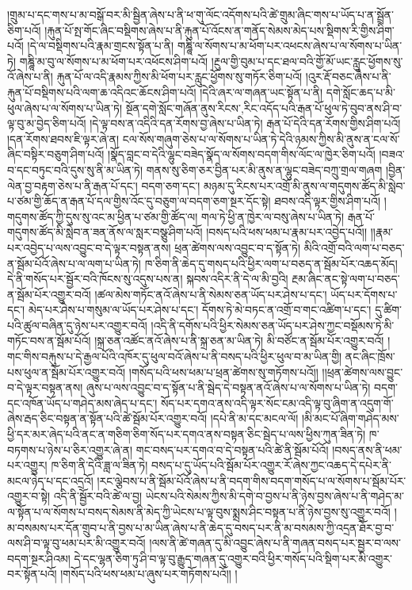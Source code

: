 །གྲུམ་པ་དང་གས་པ་མ་བསྒོ་བར་མི་སྦྱིན་ཞེས་པ་ནི་ཕ་གུ་ལོང་འདོགས་པའི་ཚེ་གྲུམ་ཞིང་གས་པ་ཡོད་པ་ན་སྦྲོན་ཅིག་པའོ། །རྐུན་པོ་སྤ་གོང་ཞིང་བསྡིགས་ཞེས་པ་ནི་རྐུན་པོ་འོངས་ན་གནོད་སེམས་མེད་པས་སྡིགས་རི་གྱིས་ཤིག་པའོ། །དེ་ལ་བསྡིགས་པའི་རྣམ་གྲངས་སྟོན་པ་ནི། གཎྜཱི་ལ་སོགས་པ་མ་ཕོག་པར་འཕངས་ཞེས་པ་ལ་སོགས་པ་ཡིན་ཏེ། གཎྜཱི་མ་བུ་ལ་སོགས་པ་མ་ཕོག་པར་འཕོངས་ཤིག་པའོ། །རྔུལ་གྱི་བུམ་པ་དང་ཐལ་བའི་གྱོ་མོ་ཡང་རླུང་ཕྱོགས་སུ་འོ་ཞེས་པ་ནི། རྐུན་པོ་ལ་འདི་རྣམས་ཀྱིས་མི་ཕོག་པར་རླུང་ཕྱོགས་སུ་གཏོར་ཅིག་པའོ། །འུར་རྡོ་བཅང་ཞེས་པ་ནི་རྐུན་པོ་བསྡིགས་པའི་ལག་ཆ་འདིའང་ཆོངས་ཤིག་པའོ། །དེའི་ཞར་ལ་གཞན་ཡང་སྟོན་པ་ནི། དགེ་སློང་ཆད་པ་མི་ཕུལ་ཞེས་པ་ལ་སོགས་པ་ཡིན་ཏེ། སྔོན་དགེ་སློང་གཞོན་ནུས་{རིངས་,རིང་}འདོད་པའི་རྒན་པོ་ཕུལ་ཏེ་བུབ་ནས་ཤི་བ་ལྟ་བུ་མ་བྱེད་ཅིག་པའོ། །དེ་ལྟ་བས་ན་འདིའི་དན་རོགས་བྱ་ཞེས་པ་ཡིན་ཏེ། རྒན་པོ་དེའི་དན་རོགས་གྱིས་ཤིག་པའོ། །དན་རོགས་ཐབས་ཇི་ལྟར་ཞེ་ན། ངལ་སོས་གཞུག་ཅེས་པ་ལ་སོགས་པ་ཡིན་ཏེ་དེའི་ཉམས་ཀྱིས་མི་ནུས་ན་ངལ་སོ་ཞིང་བསྟིར་བཅུག་ཤིག་པའོ། །སྣོད་བླང་བ་དེའི་ལྷུང་བཟེད་སྣོད་ལ་སོགས་བདག་གིས་ལོང་ལ་ཁྱེར་ཅིག་པའོ། །བཟའ་བ་དང་བཏུང་བའི་དུས་སུ་ནི་མ་ཡིན་ཏེ། གནས་སུ་ཅིག་ཅར་བྱིན་པར་མི་ནུས་ན་ལྷུང་བཟེད་བཀྲུ་གྲལ་གཞག །བྱིན་ལེན་བྱ་བརྟག་ཅེས་པ་ནི་རྒན་པོ་དང་། བདག་ཅག་དང་། མཉམ་དུ་རིངས་པར་འགྲོ་མི་ནུས་ལ་གདུགས་ཚོད་མི་སླེབ་པ་ཙམ་གྱི་ཆོད་ན་རྒན་པོ་དལ་གྱིས་འོང་དུ་བཅུག་ལ་བདག་ཅག་སྔར་དོང་སྟེ། ཐབས་འདི་ལྟར་གྱིས་ཤིག་པའོ། །གདུགས་ཚོད་ཀྱི་དུས་སུ་འང་མ་ཕྱིན་པ་ཙམ་གྱི་ཚོད་ལ། གལ་ཏེ་ཕྱི་ན་ཁྱེར་ལ་བསུ་ཞེས་པ་ཡིན་ཏེ། རྒན་པོ་གདུགས་ཚོད་མི་སླེབ་ན་ཟན་ནོས་ལ་སླར་བསྩུ་ཤིག་པའོ། །བསད་པའི་ཕས་ཕམ་པ་རྣམ་པར་འབྱེད་པའོ།། །།རྣམ་པར་འབྱེད་པ་ལས་འབྱུང་བ་དེ་ལྟར་བསྟན་ནས། ཕྲན་ཚེགས་ལས་འབྱུང་བ་ད་སྟོན་ཏེ། མིའི་འགྲོ་བའི་ལག་པ་བཅད་ན་སྦོམ་པོའོ་ཞེས་པ་ལ་ལག་པ་ཡིན་ཏེ།  ཁ་ཅིག་ནི་ཆེད་དུ་གསད་པའི་ཕྱིར་ལག་པ་བཅད་ན་སྦོམ་པོར་འཆད་མོད། དེ་ནི་གསོད་པར་སྦྱོར་བའི་ཁོངས་སུ་འདུས་པས་ན། སྐབས་འདིར་ནི་དེ་ལ་མི་བྱའི། རྔམ་ཞིང་ནང་སྟེ་ལག་པ་བཅད་ན་སྦོམ་པོར་འགྱུར་བའོ། །ཚལ་མེས་གཏོང་ནའོ་ཞེས་པ་ནི་སེམས་ཅན་ཡོད་པར་ཤེས་པ་དང་། ཡོད་པར་དོགས་པ་དང་། མེད་པར་ཤེས་པ་གསུམ་ལ་ཡོད་པར་ཤེས་པ་དང་། དོགས་ཏེ་མེ་བཏང་ན་འགྲོ་བ་གང་འཚིག་པ་དང་། དུ་ཚིག་པའི་ཚུལ་བཞིན་དུ་ཉེས་པར་འགྱུར་བའོ། །འདི་ནི་དགོས་པའི་ཕྱིར་སེམས་ཅན་ཡོད་པར་ཤེས་ཀྱང་བསྡོམས་ཏེ་མི་གཏོང་བས་ན་སྦོམ་པོའོ། །སྐྲ་ཅན་འཚོང་ནའོ་ཞེས་པ་ནི་སྐྲ་ཅན་མ་ཡིན་ཏེ། མི་བཙོང་ན་སྦོམ་པོར་འགྱུར་བའོ། །གང་གིས་བརྐུས་པ་དེ་རྒྱལ་པོའི་འཁོར་དུ་ཕུལ་བའོ་ཞེས་པ་ནི་བསད་པའི་ཕྱིར་ཕུལ་བ་མ་ཡིན་གྱི། ནང་ཞིང་ཁྲོས་པས་ཕུལ་ན་སྦོམ་པོར་འགྱུར་བའོ། །གསོད་པའི་ཕས་ཕམ་པ་ཕྲན་ཚེགས་སུ་གཏོགས་པའོ།། །།ཕྲན་ཚེགས་ལས་བྱུང་བ་དེ་ལྟར་བསྟན་ནས། ཞུས་པ་ལས་འབྱུང་བ་ད་སྟོན་པ་ནི་སྦེད་དེ་བསྟན་ནའོ་ཞེས་པ་ལ་སོགས་པ་ཡིན་ཏེ། བདག་དང་འཁོན་ཡོད་པ་གཤེད་མས་ཞེད་པ་དང་། སོད་པར་དགའ་ནས་འདི་ལྟར་སོང་ངམ་འདི་ལྟ་བུ་ཞིག་ན་འདུག་གོ་ཞེས་རྦད་ཅིང་བསྟན་ན་སྟོན་པའི་ཚེ་སྦོམ་པོར་འགྱུར་བའོ། །དཔེ་ནི་མ་དང་མངལ་ལོ། །མི་མང་པོ་ཞིག་གཤེད་མས་ཕྱི་དར་མར་ཞེད་པའི་ནང་ན་གཅིག་ཅིག་སོད་པར་དགའ་ནས་བསྟན་ཅིང་སྦེད་པ་ལས་ཕྱིས་ཀུན་ཟིན་ཏེ། ཁ་བཏགས་པ་ཉེས་པ་ཅིར་འགྱུར་ཞེ་ན། གང་བསད་པར་དགའ་བ་དེ་བསྟན་པའི་ཚེ་ནི་སྦོམ་པོའོ། །བསད་ནས་ནི་ཕམ་པར་འགྱུར། ཁ་ཅིག་ནི་དེའི་ཟླ་ལ་ཟིན་ཏེ། བསད་པ་དུ་ཡོད་པའི་སྦོམ་པོར་འགྱུར་རོ་ཞེས་ཀྱང་འཆད་དེ་དཔེར་ནི་མངལ་ཉེད་པ་དང་འདྲའོ། །རང་ལྕེབས་པ་ནི་སྦོམ་པོའོ་ཞེས་པ་ནི་བདག་གིས་བདག་གསོད་པ་ལ་སོགས་པ་སྦོམ་པོར་འགྱུར་བ་སྟེ། འདི་ནི་སྦྱོར་བའི་ཚེ་ལ་བྱ། ཡེངས་པའི་སེམས་ཀྱིས་མི་དགེ་བ་བྱས་པ་ནི་ཉེས་བྱས་ཞེས་པ་ནི་གཤེད་མ་ལ་སྟོན་པ་ལ་སོགས་པ་བསད་སེམས་ནི་མེད་ཀྱི་ཡེངས་པ་ལྟ་བུས་སྨྲས་ཤིང་བསྟན་པ་ནི་ཉེས་བྱས་སུ་འགྱུར་བའོ། །མ་བསམས་པར་དོན་གྲུབ་པ་ནི་བྱས་པ་མ་ཡིན་ཞེས་པ་ནི་ཆེད་དུ་བསད་པར་ནི་མ་བསམས་ཀྱི་འདྲན་ཐོར་བྱ་བ་ལས་ཤི་བ་ལྟ་བུ་ཕམ་པར་མི་འགྱུར་བའོ། །ལས་ནི་ཚེ་གཞན་དུ་མི་འབྱུང་ཞེས་པ་ནི་གཞན་བསད་པར་སྦྱར་བ་ལས་བདག་སྔར་ཤིའམ། དེ་དང་ལྷན་ཅིག་ཏུ་ཤི་བ་ལྟ་བུ་རྒྱུད་གཞན་དུ་འགྱུར་བའི་ཕྱིར་གསོད་པའི་སྡིག་པར་མི་འགྱུར་བར་སྟོན་པའོ། །གསོད་པའི་ཕས་ཕམ་པ་ཞུས་པར་གཏོགས་པའོ།། །

